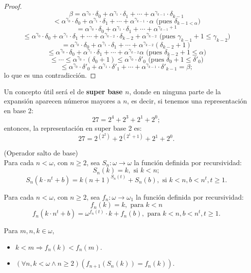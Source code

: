 \begin{proof}
    \[\beta=\alpha^{\gamma_0}\cdot\delta_0+\alpha^{\gamma_1}\cdot\delta_1+\cdots+\alpha^{\gamma_{k-1}}\cdot\delta_{k-1}\]
    \[<\alpha^{\gamma_0}\cdot\delta_0+\alpha^{\gamma_1}\cdot\delta_1+\cdots+\alpha^{\gamma_{k-1}}\cdot\alpha\text{ (pues $\delta_{k-1<\alpha}$)}\]
    \[=\alpha^{\gamma_0}\cdot\delta_0+\alpha^{\gamma_1}\cdot\delta_1+\cdots+\alpha^{\gamma_{k-1}+1}\]
    \[\leq\alpha^{\gamma_0}\cdot\delta_0+\alpha^{\gamma_1}\cdot\delta_1+\cdots+\alpha^{\gamma_{k-2}}\cdot\delta_{k-2}+\alpha^{\gamma_{k-2}}\text{ (pues $\gamma_{k-1}+1\leq\gamma_{k-2}$)}\]
    \[=\alpha^{\gamma_0}\cdot\delta_0+\alpha^{\gamma_1}\cdot\delta_1+\cdots+\alpha^{\gamma_{k-2}}(\delta_{k-2}+1)\]
    \[\leq\alpha^{\gamma_0}\cdot\delta_0+\alpha^{\gamma_1}\cdot\delta_1+\cdots+\alpha^{\gamma_{k-2}}\alpha\text{ (pues $\delta_{k-2}+1\leq\alpha$)}\]
    \[\leq\cdots\leq\alpha^{\gamma_0}\cdot(\delta_0+1)\leq\alpha^{\gamma_0}\cdot\delta'_0\text{ (pues $\delta_0+1\leq\delta'_0$)}\]
    \[\leq\alpha^{\gamma_0}\cdot\delta'_0+\alpha^{\gamma_1}\cdot\delta'_1+\cdots+\alpha^{\gamma_{k-1}}\cdot\delta'_{k-1}=\beta;\]
    lo que es una contradicción.
\end{proof}
Un concepto útil será el de \textbf{super base $n$}, donde en ninguna parte de la expansión aparecen números mayores a $n$, es decir, si tenemos una representación en base 2:
\[27=2^4+2^3+2^1+2^0;\]
entonces, la representación en super base 2 es:
\[27=2^{(2^2)}+2^{(2^1+1)}+2^1+2^0.\]
\begin{defn}\label{d37}
    (Operador salto de base)\\
    Para cada $n<\omega$, con $n\geq2$, sea $S_n:\omega\longrightarrow\omega$ la función definida por recursividad:
    \[S_n(k)=k,\text{ si }k<n;\]
    \[S_n(k\cdot n^t+b)=k{(n+1)}^{S_n(t)}+S_n(b),\text{ si }k<n,b<n^t,t\geq1.\]
\end{defn}
\begin{defn}\label{d38}
    Para cada $n<\omega$, con $n\geq2$, sea $f_n:\omega\longrightarrow\omega_1$ la función definida por recursividad:
    \[f_n(k)=k,\text{ para }k<n\]
    \[f_n(k\cdot n^t+b)=\omega^{f_n(t)}\cdot k+f_n(b),\text{ para }k<n,b<n^t,t\geq1.\]
\end{defn}
\begin{prop}\label{ex32}
    Para $m,n,k\in\omega$,
    \begin{itemize}
    \item $k<m\Longrightarrow f_n(k)<f_n(m)$.
    \item $(\forall n,k<\omega\land n\geq2)(f_{n+1}(S_n(k))=f_n(k))$.
    \end{itemize}
\end{prop}
